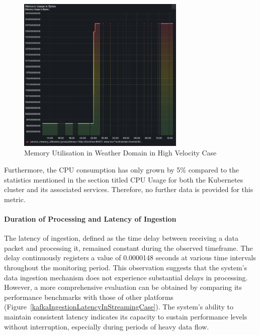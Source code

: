 \documentclass{ieeeaccess}
\begin{document}
\begin{figure}[h]

  \centering

  \includegraphics[width=8cm]{images/memory-utilization-in-weather-domain-in-streaming-case.png}

  \caption{Memory Utilisation in Weather Domain in High Velocity Case}

  \label{memoryUtilizationInWeatherDomainInHighVelocityCase}

\end{figure}

Furthermore, the CPU consumption has only grown by 5\% compared to the statistics mentioned in the section titled CPU Usage for both the Kubernetes cluster and its associated services. Therefore, no further data is provided for this metric.

\paragraph{Duration of Processing and Latency of Ingestion} The latency of ingestion, defined as the time delay between receiving a data packet and processing it, remained constant during the observed timeframe. The delay continuously registers a value of 0.0000148 seconds at various time intervals throughout the monitoring period. This observation suggests that the system's data ingestion mechanism does not experience substantial delays in processing. However, a more comprehensive evaluation can be obtained by comparing its performance benchmarks with those of other platforms (Figure~\ref{kafkaIngestionLatencyInStreamingCase}). The system's ability to maintain consistent latency indicates its capacity to sustain performance levels without interruption, especially during periods of heavy data flow.
\end{document}
